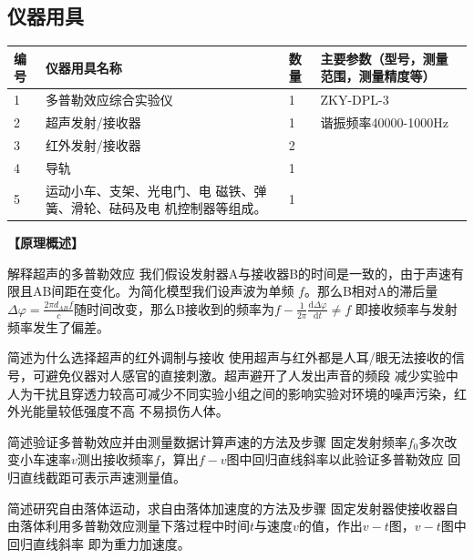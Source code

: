 \documentclass[dvipsnames, svgnames,a4paper,11pt]{article}
\renewcommand{\d}{\mathrm{d}}
\begin{document}
\subsection{仪器用具}
\begin{table}[htbp]
	\centering
	\renewcommand\arraystretch{1.6}
	\begin{tabular}{p{}|p{}|p{}|p{}}
	\hline
	编号& 仪器用具名称 & 数量 &  主要参数（型号，测量范围，测量精度等） \\
	\hline
	1&多普勒效应综合实验仪&1 &ZKY-DPL-3\\
	\hline
	2&超声发射/接收器 &1&谐振频率40000-1000Hz\\
	\hline
	3&红外发射/接收器&2&\\
	\hline
	4&导轨&1&\\
	\hline
	5&运动小车、支架、光电门、电
	磁铁、弹簧、滑轮、砝码及电
	机控制器等组成。&1&\\
	\hline
\end{tabular}
\end{table}

\textbf{【原理概述】}\\
\begin{question}
	解释超声的多普勒效应
	\tcblower
	我们假设发射器A与接收器B的时间是一致的，由于声速有限且AB间距在变化。为简化模型我们设声波为单频
	$f$。那么B相对A的滞后量$\Delta \varphi=\frac{2\pi d_{AB}f}{c}$随时间改变，那么B接收到的频率为$f-\frac{1}{2\pi}\frac{\d\Delta \varphi}{\d t}\neq f$
	即接收频率与发射频率发生了偏差。
\end{question}

\begin{question}
	简述为什么选择超声的红外调制与接收
	\tcblower
	使用超声与红外都是人耳/眼无法接收的信号，可避免仪器对人感官的直接刺激。超声避开了人发出声音的频段
	减少实验中人为干扰且穿透力较高可减少不同实验小组之间的影响实验对环境的噪声污染，红外光能量较低强度不高
	不易损伤人体。
\end{question}

\begin{question}
	简述验证多普勒效应并由测量数据计算声速的方法及步骤
	\tcblower
	固定发射频率$f_0$多次改变小车速率$v$测出接收频率$f$，算出$f-v$图中回归直线斜率以此验证多普勒效应
	回归直线截距可表示声速测量值。
\end{question}

\begin{question}
	简述研究自由落体运动，求自由落体加速度的方法及步骤
	\tcblower
	固定发射器使接收器自由落体利用多普勒效应测量下落过程中时间$t$与速度$v$的值，作出$v-t$图，$v-t$图中回归直线斜率
	即为重力加速度。
\end{question}
\end{document}

